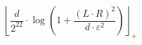 \[\left\lfloor \frac{d}{2^{22}} \cdot \log\left(1 + \frac{\left(L \cdot R\right)^{2}}{d \cdot \varepsilon^{2}}\right) \right\rfloor_{+}\]
